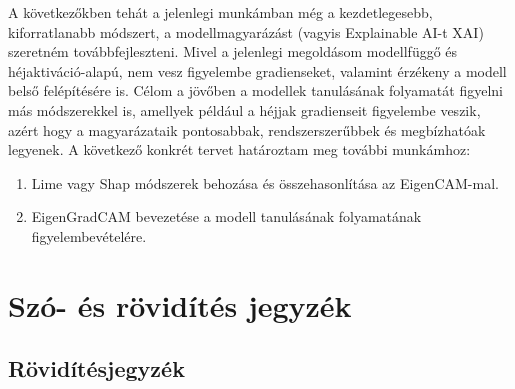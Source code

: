 \documentclass[12pt,oneside,a4paper]{article}
\newcommand{\newsection}[1]{\clearpage\section{#1}}\label{makro}
\theoremstyle{remark}
\begin{document}
    A következőkben tehát a jelenlegi munkámban még a kezdetlegesebb, kiforratlanabb módszert, a modellmagyarázást
    (vagyis Explainable AI-t
    \ac{XAI}) szeretném továbbfejleszteni.
    Mivel a jelenlegi megoldásom modellfüggő és héjaktiváció-alapú, nem vesz figyelembe gradienseket,
    valamint érzékeny a modell belső felépítésére is.
    Célom a jövőben a modellek tanulásának folyamatát figyelni más módszerekkel is, amellyek például a héjjak gradienseit
    figyelembe veszik, azért hogy a magyarázataik pontosabbak, rendszerszerűbbek és megbízhatóak legyenek.
    A következő konkrét tervet határoztam meg további munkámhoz:
    \begin{enumerate}
        \item Lime vagy Shap módszerek behozása és összehasonlítása az EigenCAM-mal.
               \cite{ribeiro-etal-2016-trust,lundberg2017unified}
        \item EigenGradCAM bevezetése a modell tanulásának folyamatának figyelembevételére.
    \end{enumerate}


\printindex\label{ossz:indexjegyzek}

\newsection{Szó- és rövidítés jegyzék}\label{sec:szó-es-rövidités-jegyzék}
\printglossary\label{ossz:glossary}
\newpage
\subsection{Rövidítésjegyzék}\label{subsec:röviditésjegyzék}
\begin{acronym}\label{ossz:roviditesjegyzek}
\end{acronym}
\newpage

\label{ossz:irodalomjegyzek}
\end{document}
